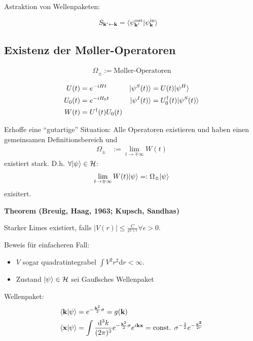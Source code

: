 \documentclass[11pt,a4paper]{report}
\begin{document}
Astraktion von Wellenpaketen:

\begin{align*}
    S_{\mathbf{k}' \leftarrow \mathbf{k}} &= \langle \psi_{\mathbf{k}'}^{\text{out}}|\psi_{\mathbf{k}}^{\text{in}}\rangle
\end{align*}

\subsection{Existenz der M{\o}ller-Operatoren}

\begin{align*}
    \Omega_\pm := \text{M{\o}ller-Operatoren}
\end{align*}

\begin{align*}
    U(t) &= e^{- i H t} & |\psi^S(t)\rangle &= U(t) |\psi^H \rangle \\
    U_0(t) &= e^{- i H_0 t} & |\psi^I(t)\rangle &= U_0^\dagger(t) |\psi^S(t) \rangle \\
    W(t) &= U^\dagger(t) U_0(t) 
\end{align*}

Erhoffe eine ``gutartige'' Situation: Alle Operatoren existieren und haben einen gemeinsamen Definitionsbereich und 
\begin{align*}
    \Omega_\pm &:= \lim_{t \rightarrow \mp \infty} W(t)
\end{align*}
existiert stark.
D.h. $\forall |\psi\rangle \in \mathcal{H}$:
\begin{align*}
    \lim_{t \rightarrow \mp \infty} W(t) |\psi\rangle =: \Omega_\pm |\psi\rangle
\end{align*}
exisitert.

\textbf{Theorem (Breuig, Haag, 1963; Kupsch, Sandhas)}

Starker Limes existiert, falls $|V(r)| \leq \frac{C}{r^{1+\epsilon}} \forall \epsilon>0$.

Beweis für einfacheren Fall: 
\begin{itemize}
    \item $V$ sogar quadratintegrabel $\int V^2 r^2 \mathrm{d}r < \infty$.
    \item Zustand $|\psi\rangle \in \mathcal{H}$ sei Gaußsches Wellenpaket
\end{itemize}

Wellenpaket:
\begin{align*}
    \langle \mathbf{k}|\psi\rangle &= e^{- \frac{\mathbf{k}^2}{2}\sigma} = g(\mathbf{k}) \\
    \langle \mathbf{x}|\psi\rangle &= \int \frac{\mathrm{d}^3 k}{(2\pi)^3} e^{- \frac{\mathbf{k}^2}{2}\sigma} e^{i \mathbf{k} \mathbf{x}} = \text{const. } \sigma^{-\frac{3}{2}} e^{-\frac{\mathbf{x^2}}{2 r}}
\end{align*}
\end{document}
